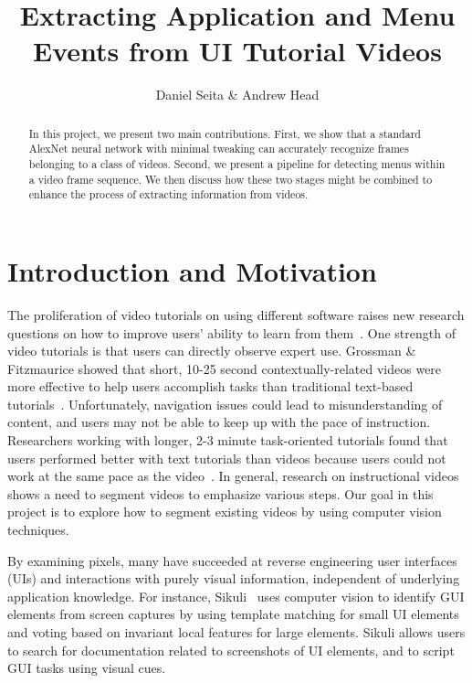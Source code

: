 \documentclass[10pt]{article}
\title{Extracting Application and Menu Events from UI Tutorial Videos}
\author{Daniel Seita \& Andrew Head}
\begin{document}
\maketitle

\begin{abstract}
In this project, we present two main contributions. First, we show that a standard AlexNet neural
network with minimal tweaking can accurately recognize frames belonging to a class of videos.
Second, we present a pipeline for detecting menus within a video frame sequence. We then discuss how
these two stages might be combined to enhance the process of extracting information from videos.
\end{abstract}

\section{Introduction and Motivation}

The proliferation of video tutorials on using different software raises new research questions on
how to improve users' ability to learn from them~\cite{matejka_ambient_2011,
pongnumkul_pause-and-play_2011}.  One strength of video tutorials is that users can directly observe
expert use. Grossman \& Fitzmaurice showed that short, 10-25 second contextually-related videos were
more effective to help users accomplish tasks than traditional text-based
tutorials~\cite{grossman_toolclips_2010}.  Unfortunately, navigation issues could lead to
misunderstanding of content, and users may not be able to keep up with the pace of instruction.
Researchers working with longer, 2-3 minute task-oriented tutorials found that users performed
better with text tutorials than videos because users could not work at the same pace as the
video~\cite{grabler_generating_2009}. In general, research on instructional videos shows a need to
segment videos to emphasize various steps. Our goal in this project is to explore how to segment
existing videos by using computer vision techniques.

By examining pixels, many have succeeded at reverse engineering user interfaces (UIs) and
interactions with purely visual information, independent of underlying application knowledge.  For
instance, Sikuli~\cite{yeh_sikuli_2009} uses computer vision to identify GUI elements from screen
captures by using template matching for small UI elements and voting based on invariant local
features for large elements. Sikuli allows users to search for documentation related to screenshots
of UI elements, and to script GUI tasks using visual cues.
\end{document}

